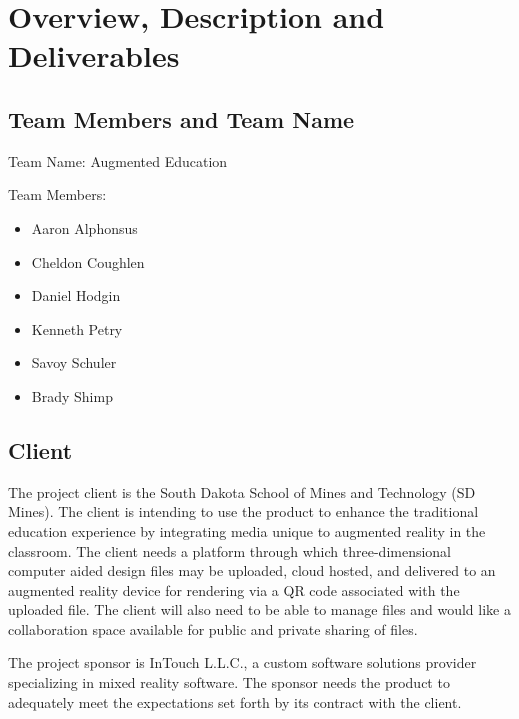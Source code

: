 

\chapter{Overview, Description and Deliverables}


\section{Team Members and Team Name}

Team Name: Augmented Education

\noindent Team Members:
\begin{itemize}
	\item Aaron Alphonsus
	\item Cheldon Coughlen
	\item Daniel Hodgin
	\item Kenneth Petry
	\item Savoy Schuler
	\item Brady Shimp
\end{itemize}

\section{Client}

The project client is the South Dakota School of Mines and Technology (SD Mines). The client is intending to use the product to enhance the traditional education experience by integrating media unique to augmented reality in the classroom. The client needs a platform through which three-dimensional computer aided design files may be uploaded, cloud hosted, and delivered to an augmented reality device for rendering via a QR code associated with the uploaded file. The client will also need to be able to manage files and would like a collaboration space available for public and private sharing of files. 

The project sponsor is InTouch L.L.C., a custom software solutions provider specializing in mixed reality software. The sponsor needs the product to adequately meet the expectations set forth by its contract with the client. 


